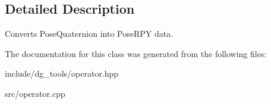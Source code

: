 \subsection{Detailed Description}
Converts Pose\+Quaternion into Pose\+R\+PY data. 

The documentation for this class was generated from the following files\+:\begin{DoxyCompactItemize}
\item 
include/dg\+\_\+tools/operator.\+hpp\item 
src/operator.\+cpp\end{DoxyCompactItemize}
